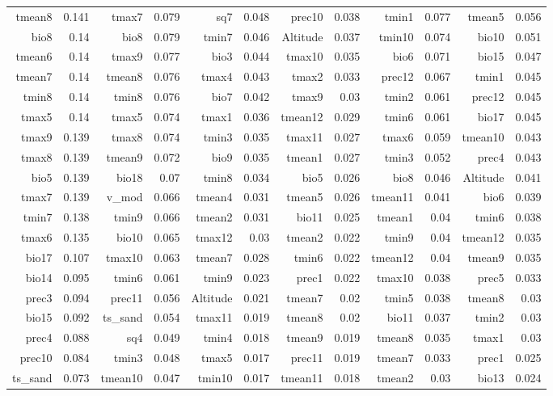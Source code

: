 \documentclass[11pt]{article}
\begin{document}
\begin{linenumbers}
\begin{flushleft}
\begin{table}[htbp]
\begin{tabular}{rrrrrrrrrrrr}
    tmean8 & 0.141 & tmax7 & 0.079 & sq7   & 0.048 & prec10 & 0.038 & tmin1 & 0.077 & tmean5 & 0.056 \\
    bio8  & 0.14  & bio8  & 0.079 & tmin7 & 0.046 & Altitude & 0.037 & tmin10 & 0.074 & bio10 & 0.051 \\
    tmean6 & 0.14  & tmax9 & 0.077 & bio3  & 0.044 & tmax10 & 0.035 & bio6  & 0.071 & bio15 & 0.047 \\
    tmean7 & 0.14  & tmean8 & 0.076 & tmax4 & 0.043 & tmax2 & 0.033 & prec12 & 0.067 & tmin1 & 0.045 \\
    tmin8 & 0.14  & tmin8 & 0.076 & bio7  & 0.042 & tmax9 & 0.03  & tmin2 & 0.061 & prec12 & 0.045 \\
    tmax5 & 0.14  & tmax5 & 0.074 & tmax1 & 0.036 & tmean12 & 0.029 & tmin6 & 0.061 & bio17 & 0.045 \\
    tmax9 & 0.139 & tmax8 & 0.074 & tmin3 & 0.035 & tmax11 & 0.027 & tmax6 & 0.059 & tmean10 & 0.043 \\
    tmax8 & 0.139 & tmean9 & 0.072 & bio9  & 0.035 & tmean1 & 0.027 & tmin3 & 0.052 & prec4 & 0.043 \\
    bio5  & 0.139 & bio18 & 0.07  & tmin8 & 0.034 & bio5  & 0.026 & bio8  & 0.046 & Altitude & 0.041 \\
    tmax7 & 0.139 & v\_mod & 0.066 & tmean4 & 0.031 & tmean5 & 0.026 & tmean11 & 0.041 & bio6  & 0.039 \\
    tmin7 & 0.138 & tmin9 & 0.066 & tmean2 & 0.031 & bio11 & 0.025 & tmean1 & 0.04  & tmin6 & 0.038 \\
    tmax6 & 0.135 & bio10 & 0.065 & tmax12 & 0.03  & tmean2 & 0.022 & tmin9 & 0.04  & tmean12 & 0.035 \\
    bio17 & 0.107 & tmax10 & 0.063 & tmean7 & 0.028 & tmin6 & 0.022 & tmean12 & 0.04  & tmean9 & 0.035 \\
    bio14 & 0.095 & tmin6 & 0.061 & tmin9 & 0.023 & prec1 & 0.022 & tmax10 & 0.038 & prec5 & 0.033 \\
    prec3 & 0.094 & prec11 & 0.056 & Altitude & 0.021 & tmean7 & 0.02  & tmin5 & 0.038 & tmean8 & 0.03 \\
    bio15 & 0.092 & ts\_sand & 0.054 & tmax11 & 0.019 & tmean8 & 0.02  & bio11 & 0.037 & tmin2 & 0.03 \\
    prec4 & 0.088 & sq4   & 0.049 & tmin4 & 0.018 & tmean9 & 0.019 & tmean8 & 0.035 & tmax1 & 0.03 \\
    prec10 & 0.084 & tmin3 & 0.048 & tmax5 & 0.017 & prec11 & 0.019 & tmean7 & 0.033 & prec1 & 0.025 \\
    ts\_sand & 0.073 & tmean10 & 0.047 & tmin10 & 0.017 & tmean11 & 0.018 & tmean2 & 0.03  & bio13 & 0.024 \\

\end{tabular}
\end{table}
\end{flushleft}
\end{linenumbers}
\end{document}
